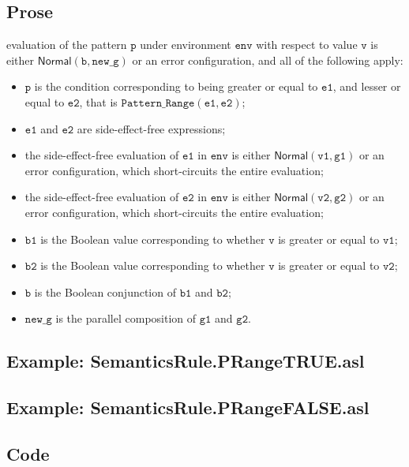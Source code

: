 \documentclass{book}
\newcommand\ProseOrError[0]{or an error configuration, which short-circuits the entire evaluation}
\newcommand\Normal[0]{\textsf{Normal}}
\newcommand\env[0]{\texttt{env}}
\newcommand\newg[0]{\texttt{new\_g}}
\newcommand\vp[0]{\texttt{p}}
\newcommand\vv[0]{\texttt{v}}
\newcommand\vvone[0]{\texttt{v1}}
\newcommand\vvtwo[0]{\texttt{v2}}
\newcommand\veone[0]{\texttt{e1}}
\newcommand\vetwo[0]{\texttt{e2}}
\newcommand\vgone[0]{\texttt{g1}}
\newcommand\vgtwo[0]{\texttt{g2}}
\newcommand\vb[0]{\texttt{b}}
\newcommand\vbone[0]{\texttt{b1}}
\newcommand\vbtwo[0]{\texttt{b2}}
\begin{document}
    \subsection{Prose}
    evaluation of the pattern $\vp$ under environment $\env$ with
    respect to value $\vv$ is either $\Normal(\vb, \newg)$ or an error configuration,
    and all of the following apply:
    \begin{itemize}
      \item $\vp$ is the condition corresponding to being greater or equal
        to $\veone$, and lesser or equal to $\vetwo$, that is $\texttt{Pattern\_Range}(\veone, \vetwo)$;
      \item $\veone$ and $\vetwo$ are side-effect-free expressions;
      \item the side-effect-free evaluation of $\veone$ in $\env$ is either $\Normal(\vvone, \vgone)$ \ProseOrError;
      \item the side-effect-free evaluation of $\vetwo$ in $\env$ is either $\Normal(\vvtwo, \vgtwo)$ \ProseOrError;
      \item $\vbone$ is the Boolean value corresponding to whether
        $\vv$ is greater or equal to $\vvone$;
        \item $\vbtwo$ is the Boolean value corresponding to whether
        $\vv$ is greater or equal to $\vvtwo$;
      \item $\vb$ is the Boolean conjunction of $\vbone$ and
      $\vbtwo$;
      \item $\newg$ is the parallel composition of $\vgone$ and $\vgtwo$.
    \end{itemize}

    \subsection{Example: SemanticsRule.PRangeTRUE.asl}

    \subsection{Example: SemanticsRule.PRangeFALSE.asl}

  \subsection{Code}
\end{document}
